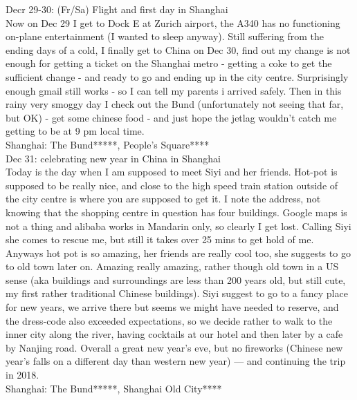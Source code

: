 Decr 29-30: (Fr/Sa) Flight and first day in Shanghai\\
Now on Dec 29 I get to Dock E at Zurich airport, the A340 has no functioning on-plane entertainment (I wanted to sleep anyway). Still suffering from the ending days of a cold, I finally get to China on Dec 30, find out my change is not enough for getting a ticket on the Shanghai metro - getting a coke to get the sufficient change - and ready to go and ending up in the city centre. Surprisingly enough gmail still works - so I can tell my parents i arrived safely. Then in this rainy very smoggy day I check out the Bund (unfortunately not seeing that far, but OK) - get some chinese food - and just hope the jetlag wouldn't catch me getting to be at 9 pm local time.\\

Shanghai: The Bund*****, People's Square****\\

Dec 31: celebrating new year in China in Shanghai\\
Today is the day when I am supposed to meet Siyi and her friends. Hot-pot is supposed to be really nice, and close to the high speed train station outside of the city centre is where you are supposed to get it. I note the address, not knowing that the shopping centre in question has four buildings. Google maps is not a thing and alibaba works in Mandarin only, so clearly I get lost. Calling Siyi she comes to rescue me, but still it takes over 25 mins to get hold of me. Anyways hot pot is so amazing, her friends are really cool too, she suggests to go to old town later on. Amazing really amazing, rather though old town in a US sense (aka buildings and surroundings are less than 200 years old, but still cute, my first rather traditional Chinese buildings). Siyi suggest to go to a fancy place for new years, we arrive there but seems we might have needed to reserve, and the dress-code also exceeded expectations, so we decide rather to walk to the inner city along the river, having cocktails at our hotel and then later by a cafe by Nanjing road. Overall a great new year's eve, but no fireworks (Chinese new year's falls on a different day than western new year) --- and continuing the trip in 2018.\\

Shanghai: The Bund*****, Shanghai Old City****\\
